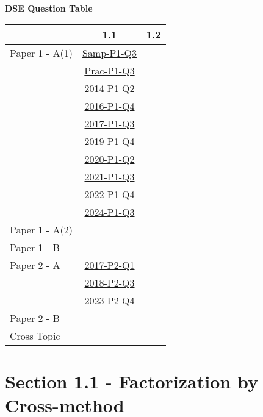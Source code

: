 \documentclass[12pt, a4paper]{article}
\begin{document}
\begin{absolutelynopagebreak}
\begin{center}
\textbf{DSE Question Table}
\end{center}
\begin{center}
\begin{tabular}{|l|c|c|}
\hline
        & 1.1 & 1.2 \\\hline
\hline
Paper 1 - A(1)& \hyperref[DSE2012S-CoreP1-Q03]{Samp-P1-Q3} &  \\
& \hyperref[DSE2012P-CoreP1-Q03]{Prac-P1-Q3} &  \\
& \hyperref[DSE2014-CoreP1-Q02]{2014-P1-Q2} &  \\
& \hyperref[DSE2016-CoreP1-Q04]{2016-P1-Q4} &  \\
& \hyperref[DSE2017-CoreP1-Q03]{2017-P1-Q3} &  \\
& \hyperref[DSE2019-CoreP1-Q04]{2019-P1-Q4} &  \\
& \hyperref[DSE2020-CoreP1-Q02]{2020-P1-Q2} &  \\
& \hyperref[DSE2021-CoreP1-Q03]{2021-P1-Q3} &  \\
& \hyperref[DSE2022-CoreP1-Q04]{2022-P1-Q4} &  \\
& \hyperref[DSE2024-CoreP1-Q03]{2024-P1-Q3} &  \\
\hline
Paper 1 - A(2)&  &  \\
\hline
Paper 1 - B&  &  \\
\hline
\hline
Paper 2 - A& \hyperref[DSE2017-CoreP2-Q01]{2017-P2-Q1} &  \\
& \hyperref[DSE2018-CoreP2-Q03]{2018-P2-Q3} &  \\
& \hyperref[DSE2023-CoreP2-Q04]{2023-P2-Q4} &  \\
\hline
Paper 2 - B&  &  \\
\hline
\hline
Cross Topic&  &  \\
\hline
\end{tabular}
\end{center}
\end{absolutelynopagebreak}




\section*{Section 1.1 - Factorization by Cross-method}\label{section:3-1-1}
\end{document}
